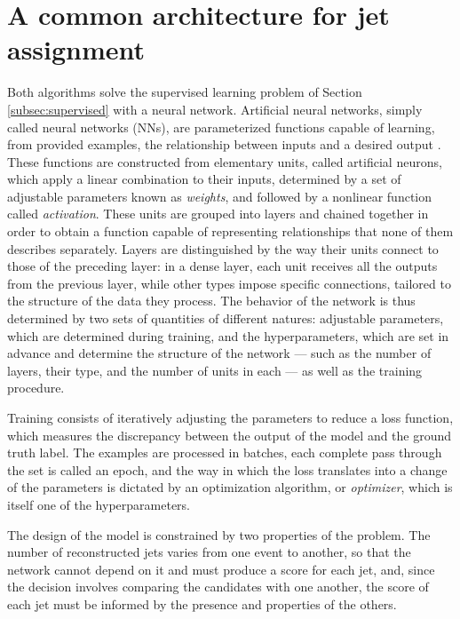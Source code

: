 \section{A common architecture for jet assignment}
\label{sec:architecture}
%
Both algorithms solve the supervised learning problem of Section \ref{subsec:supervised} with a neural network. Artificial neural networks, simply called neural networks (NNs), are parameterized functions capable of learning, from provided examples, the relationship between inputs and a desired output \cite{Goodfellow2016}. These functions are constructed from elementary units, called artificial neurons, which apply a linear combination to their inputs, determined by a set of adjustable parameters known as \textit{weights}, and followed by a nonlinear function called \textit{activation}. These units are grouped into layers and chained together in order to obtain a function capable of representing relationships that none of them describes separately. Layers are distinguished by the way their units connect to those of the preceding layer: in a dense layer, each unit receives all the outputs from the previous layer, while other types impose specific connections, tailored to the structure of the data they process. The behavior of the network is thus determined by two sets of quantities of different natures: adjustable parameters, which are determined during training, and the hyperparameters, which are set in advance and determine the structure of the network — such as the number of layers, their type, and the number of units in each — as well as the training procedure.

Training consists of iteratively adjusting the parameters to reduce a loss function, which measures the discrepancy between the output of the model and the ground truth label. The examples are processed in batches, each complete pass through the set is called an epoch, and the way in which the loss translates into a change of the parameters is dictated by an optimization algorithm, or \textit{optimizer}, which is itself one of the hyperparameters.

%

The design of the model is constrained by two properties of the problem. The number of reconstructed jets varies from one event to another, so that the network cannot depend on it and must produce a score for each jet, and, since the decision involves comparing the candidates with one another, the score of each jet must be informed by the presence and properties of the others.

